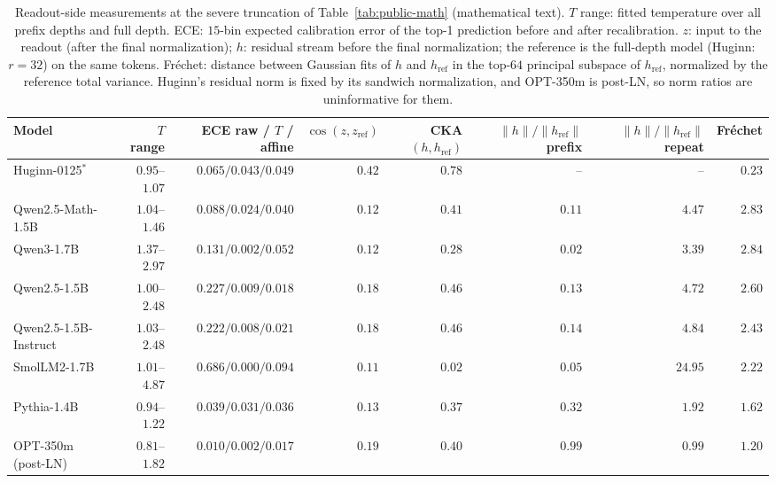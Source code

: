 \begin{table}[t]
\centering
\scriptsize\setlength{\tabcolsep}{3pt}
\begin{tabular}{lrrrrrrr}
\toprule
Model & $T$ range & ECE raw / $T$ / affine & $\cos(z, z_{\text{ref}})$ & CKA$(h, h_{\text{ref}})$ & $\|h\|/\|h_{\text{ref}}\|$ prefix & $\|h\|/\|h_{\text{ref}}\|$ repeat & Fr\'echet \\
\midrule
Huginn-0125$^{\ast}$ & $0.95$--$1.07$ & $0.065 / 0.043 / 0.049$ & $0.42$ & $0.78$ & -- & -- & $0.23$ \\
Qwen2.5-Math-1.5B & $1.04$--$1.46$ & $0.088 / 0.024 / 0.040$ & $0.12$ & $0.41$ & $0.11$ & $4.47$ & $2.83$ \\
Qwen3-1.7B & $1.37$--$2.97$ & $0.131 / 0.002 / 0.052$ & $0.12$ & $0.28$ & $0.02$ & $3.39$ & $2.84$ \\
Qwen2.5-1.5B & $1.00$--$2.48$ & $0.227 / 0.009 / 0.018$ & $0.18$ & $0.46$ & $0.13$ & $4.72$ & $2.60$ \\
Qwen2.5-1.5B-Instruct & $1.03$--$2.48$ & $0.222 / 0.008 / 0.021$ & $0.18$ & $0.46$ & $0.14$ & $4.84$ & $2.43$ \\
SmolLM2-1.7B & $1.01$--$4.87$ & $0.686 / 0.000 / 0.094$ & $0.11$ & $0.02$ & $0.05$ & $24.95$ & $2.22$ \\
Pythia-1.4B & $0.94$--$1.22$ & $0.039 / 0.031 / 0.036$ & $0.13$ & $0.37$ & $0.32$ & $1.92$ & $1.62$ \\
OPT-350m (post-LN) & $0.81$--$1.82$ & $0.010 / 0.002 / 0.017$ & $0.19$ & $0.40$ & $0.99$ & $0.99$ & $1.20$ \\
\bottomrule
\end{tabular}
\caption{Readout-side measurements at the severe truncation of Table~\ref{tab:public-math} (mathematical text). $T$ range: fitted temperature over all prefix depths and full depth. ECE: $15$-bin expected calibration error of the top-1 prediction before and after recalibration. $z$: input to the readout (after the final normalization); $h$: residual stream before the final normalization; the reference is the full-depth model (Huginn: $r = 32$) on the same tokens. Fr\'echet: distance between Gaussian fits of $h$ and $h_{\text{ref}}$ in the top-$64$ principal subspace of $h_{\text{ref}}$, normalized by the reference total variance. Huginn's residual norm is fixed by its sandwich normalization, and OPT-350m is post-LN, so norm ratios are uninformative for them.}
\label{tab:public-geometry}
\end{table}

